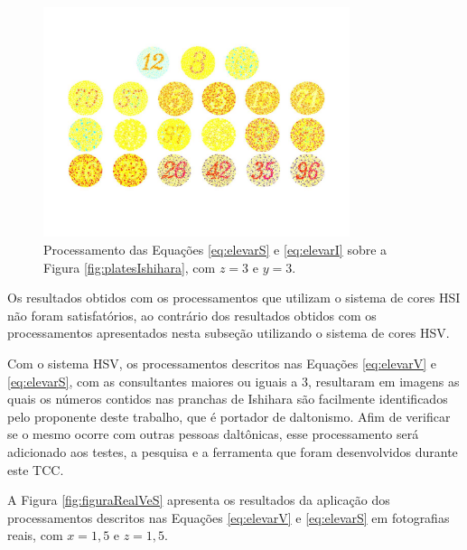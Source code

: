 \documentclass[	12pt, Times, openright, twoside, a4paper, english, brazil]{abntex2}
\begin{document}
\begin{figure}[!htb]
\centering \includegraphics[width=0.80\textwidth]{figuraElevarSeI.jpg}
\caption{Processamento das Equações \ref{eq:elevarS} e \ref{eq:elevarI} sobre a Figura \ref{fig:platesIshihara}, com $z = 3$ e $y = 3$. \label{fig:figuraElevarSeI}}
\end{figure}

Os resultados obtidos com os processamentos que utilizam o sistema de cores HSI não foram satisfatórios, ao contrário dos resultados obtidos com os processamentos apresentados nesta subseção utilizando o sistema de cores HSV.

Com o sistema HSV, os processamentos descritos nas Equações \ref{eq:elevarV} e \ref{eq:elevarS}, com as consultantes maiores ou iguais a 3, resultaram em imagens as quais os números contidos nas pranchas de Ishihara são facilmente identificados pelo proponente deste trabalho, que é portador de daltonismo. Afim de verificar se o mesmo ocorre com outras pessoas daltônicas, esse processamento será adicionado aos testes, a pesquisa e a ferramenta que foram desenvolvidos durante este TCC.

A Figura \ref{fig:figuraRealVeS} apresenta os resultados da aplicação dos processamentos descritos nas Equações \ref{eq:elevarV} e \ref{eq:elevarS} em fotografias reais, com $x = 1,5$ e $z = 1,5$.
\end{document}
